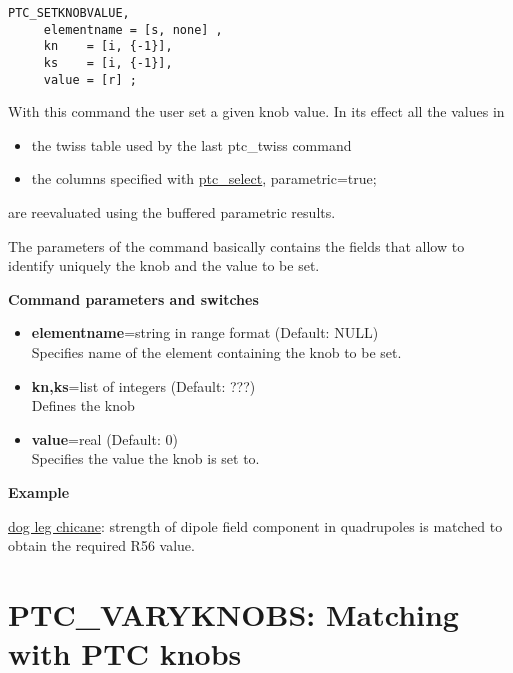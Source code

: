 \begin{verbatim}
PTC_SETKNOBVALUE, 
     elementname = [s, none] , 
     kn    = [i, {-1}], 
     ks    = [i, {-1}], 
     value = [r] ; 
\end{verbatim}

With this command the user set a given knob value. In its effect all the values in 
\begin{itemize}
   \item  the twiss table used by the last ptc\_twiss command 
   \item  the columns specified with
     \href{PTC_Select.html}{ptc\_select}, parametric=true; 
\end{itemize} 
are reevaluated using the buffered parametric results.  

The parameters of the command basically contains the fields that allow
to identify uniquely the knob and the value to be set.

{\bf Command parameters and switches}
\begin{itemize}
   \item {\bf elementname}=string in range format (Default: NULL)\\
     Specifies name of the element containing the knob to be set.   

   \item {\bf kn,ks}=list of integers (Default: ???)\\
     Defines the knob   

   \item {\bf value}=real (Default: 0)\\
     Specifies the value the knob is set to.             
\end{itemize}

{\bf Example }

\href{http://cern.ch/frs/mad-X_examples/ptc_madx_interface/matchknobs/matchknobs.madx}{dog
  leg chicane}: strength of dipole field component in quadrupoles is
matched to obtain the required R56 value.    


% 





%

\section{PTC\_VARYKNOBS: Matching with PTC knobs}

